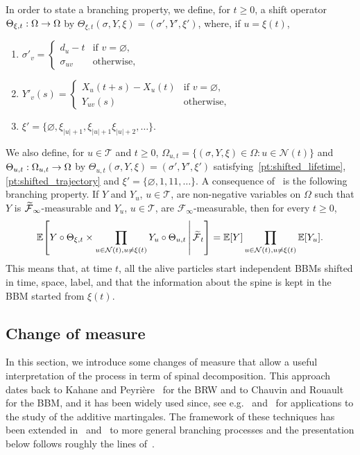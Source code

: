 \documentclass[AHL,Unicode,longabstracts,published]{cedram}
\newcommand{\E}{\mathbb{E}}
\newcommand\1{\mathds{1}}
\newcommand{\cF}{\mathcal{F}}
\newcommand{\cN}{\mathcal{N}}
\newcommand{\cT}{\mathcal{T}}
\newcommand*{\relabel}{\renewcommand{\labelenumi}{(\theenumi)}}
\newcommand*{\romanenumi}{\renewcommand*{\theenumi}{\roman{enumi}}\relabel}
\let\oldtilde\tilde
\renewcommand*{\tilde}[1]{\mathchoice{\widetilde{#1}}{\widetilde{#1}}{\oldtilde{#1}}{\oldtilde{#1}}}
\let\originalleft\left
\let\originalright\right
\renewcommand{\left}{\mathopen{}\mathclose\bgroup\originalleft}
\renewcommand{\right}{\aftergroup\egroup\originalright}
\renewcommand*{\to}{\mathchoice{\longrightarrow}{\rightarrow}{\rightarrow}{\rightarrow}}
\begin{document}
In order to state a branching property, we define, for $t \geq 0$, a shift operator $\Theta_{\xi, t} : \Omega \to \Omega$ by $\Theta_{\xi, t}(\sigma, Y, \xi) = (\sigma', Y', \xi')$, where, if $u = \xi(t)$,
\begin{enumerate}\romanenumi
\item\label{pt:shifted_lifetime}
$\sigma'_v =
\begin{cases}
d_u - t & \text{if } v = \varnothing, \\
\sigma_{uv} & \text{otherwise},
\end{cases}$
\item\label{pt:shifted_trajectory}
$Y'_v(s) =
\begin{cases}
X_u(t + s) - X_u(t) & \text{if } v = \varnothing, \\
Y_{uv}(s) & \text{otherwise},
\end{cases}$
\item $\xi' = \{\varnothing, \xi_{|u| + 1}, \xi_{|u| + 1}\xi_{|u| + 2}, \dots \}$.
\end{enumerate}
We also define, for $u \in \cT$ and $t \geq 0$, $\Omega_{u, t} = \{(\sigma, Y, \xi) \in \Omega : u \in \cN(t)\}$ and $\Theta_{u, t} : \Omega_{u, t} \to \Omega$ by $\Theta_{u, t}(\sigma, Y, \xi) = (\sigma', Y', \xi')$ satisfying~\eqref{pt:shifted_lifetime}, \eqref{pt:shifted_trajectory} and $\xi' = \{\varnothing, 1, 11, \dots \}$. A consequence of~\cite[Proposition~2.1]{Chauvin1991} is the following branching property. If $Y$ and $Y_u$, $u \in \cT$, are non-negative variables on $\Omega$ such that $Y$ is $\tilde{\cF}_\infty$-measurable and $Y_u$, $u \in \cT$, are $\cF_\infty$-measurable, then for every $t \geq 0$,
\begin{equation}\label{eq:branching_property_with_spine}
\E \left[Y \circ \Theta_{\xi, t} \times \prod_{u \in \cN(t), u \neq \xi(t)} Y_u \circ \Theta_{u, t} \,\middle|\, \tilde{\cF}_t \right] = \E[Y] \prod_{u \in \cN(t), u \neq \xi(t)} \E[Y_u]. 
\end{equation}
This means that, at time $t$, all the alive particles start independent BBMs shifted in time, space, label, and that the information about the spine is kept in the BBM started from $\xi(t)$.

\subsection{Change of measure}\label{subsec:change_of_measure}

In this section, we introduce some changes of measure that allow a useful interpretation of the process in term of spinal decomposition. This approach dates back to Kahane and Peyrière~\cite{KahanePeyriere1976} for the BRW and to Chauvin and Rouault~\cite{ChauvinRouault1988} for the BBM, and it has been widely used since, see e.g.~\cite{Lyons1997} and~\cite{Kyprianou2004} for applications to the study of the additive martingales. The framework of these techniques has been extended in~\cite{HardyHarris2006} and~\cite{HarrisRoberts2017} to more general branching processes and the presentation below follows roughly the lines of~\cite{HardyHarris2006}.
\end{document}
